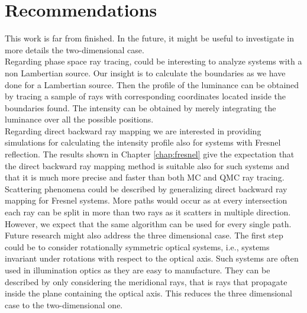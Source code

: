 \section{Recommendations}
This work is far from finished. In the future, it might be useful to investigate in more details the two-dimensional case. \\ \indent 
Regarding phase space ray tracing, could be interesting to analyze systems with a non Lambertian source. Our insight is to calculate the boundaries as we have done for a Lambertian source. Then the profile of the luminance can be obtained by tracing a sample of rays with corresponding coordinates located inside the boundaries found. The intensity can be obtained by merely integrating the luminance over all the possible positions. \\ \indent 
Regarding direct backward ray mapping we are interested in providing simulations for calculating the intensity profile also for systems with Fresnel reflection. The results shown in Chapter \ref{chap:fresnel} give the expectation that the direct backward ray mapping method is suitable also for such systems and that it is much more precise and faster than both MC and QMC ray tracing. Scattering phenomena could be described by generalizing direct backward ray mapping for Fresnel systems. More paths would occur as at every intersection each ray can be split in more than two rays as it scatters in multiple direction. However, we expect that the same algorithm can be used for every single path. 
 \\ \indent 
Future research might also address the three dimensional case. The first step could be to consider rotationally symmetric optical systems, i.e., systems invariant under rotations with respect to the optical axis. Such systems are often used in illumination optics as they are easy to manufacture. They can be described by only considering the meridional rays, that is rays that propagate inside the plane containing the optical axis. This reduces the three dimensional case to the two-dimensional one. 
